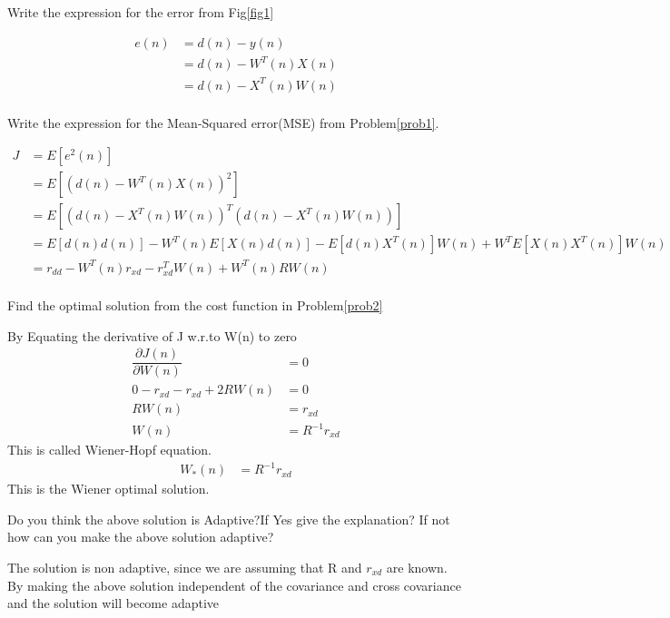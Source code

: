 \documentclass[journal,12pt,twocolumn]{IEEEtran}
\begin{document}
\begin{problem}
Write the expression for the error from Fig\ref{fig1}
\label{prob1}
\end{problem} 
\solution
\begin{align*}
e(n)&=d(n) - y(n)\\
&=d(n) - W^{T}(n) X(n)\\
&=d(n) - X^{T}(n)W(n)\\
\end{align*}
\begin{problem}
Write the expression for the Mean-Squared error(MSE) from Problem\ref{prob1}. \label{prob2}
\end{problem}
\solution
\begin{align*}
J&=E[e^{2}(n)]\\
&=E[(d(n) - W^{T}(n) X(n))^{2}]\\
&=E[(d(n) - X^{T}(n)W(n))^{T}(d(n) - X^{T}(n)W(n))]\\
&=E[d(n)d(n)] - W^{T}(n)E[X(n)d(n)]-E[d(n)X^{T}(n)]W(n) + W^{T}E[X(n)X^{T}(n)]W(n)\\
&=r_{dd} - W^{T}(n)r_{xd} - r^{T}_{xd}W(n) + W^{T}(n) R W(n)\\
\end{align*}
\begin{problem}
Find the optimal solution from the cost function in Problem\ref{prob2}
\end{problem}
\solution By Equating the derivative of J w$.$r$.$to W(n) to zero \\
\begin{align*}
\dfrac{\partial J(n)}{\partial W(n)}&=0\\
0 - r_{xd} - r_{xd} + 2 R W(n)&=0\\
R W(n)&=r_{xd}\\
W(n)&=R^{-1} r_{xd}
\end{align*}
This is called Wiener-Hopf equation. 
\begin{align*}
W_{*}(n)&=R^{-1} r_{xd}
\end{align*}
This is the Wiener optimal solution.
\begin{problem}
Do you think the above solution is Adaptive?If Yes give the explanation? If not how can you make the above solution adaptive?
\end{problem}
\solution The solution is non adaptive, since we are assuming that R and $r_{xd}$ are known.\\
By making the above solution independent of the covariance and cross covariance and the solution will become adaptive\\
\end{document}
